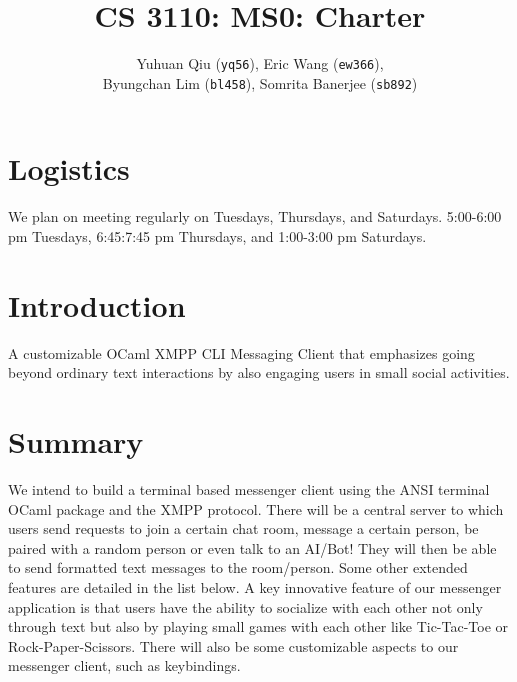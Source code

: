 \documentclass[a4paper]{article}
\title{
    \vspace{-4.0cm}
	CS 3110: MS0: Charter
}
\author{
	Yuhuan Qiu (\texttt{yq56}),
	Eric Wang (\texttt{ew366}),
    \\Byungchan Lim (\texttt{bl458}),
	Somrita Banerjee (\texttt{sb892})
}
\begin{document}
\maketitle

\section{Logistics}

We plan on meeting regularly on Tuesdays, Thursdays, and Saturdays.
5:00-6:00 pm Tuesdays,
6:45:7:45 pm Thursdays, and
1:00-3:00 pm Saturdays.

\section{Introduction}

A customizable OCaml XMPP CLI Messaging Client that emphasizes going beyond
ordinary text interactions by also engaging users in small social activities.

\section{Summary}

We intend to build a terminal based messenger client using the ANSI terminal
OCaml package and the XMPP protocol. There will be a central server to which
users send requests to join a certain chat room, message a certain person, be
paired with a random person or even talk to an AI/Bot! They will then be able to
send formatted text messages to the room/person. Some other extended features
are detailed in the list below. A key innovative feature of our messenger
application is that users have the ability to socialize with each other not only
through text but also by playing small games with each other like Tic-Tac-Toe or
Rock-Paper-Scissors. There will also be some customizable aspects to our
messenger client, such as keybindings.
\end{document}
